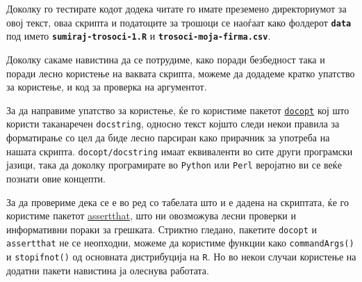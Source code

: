 \documentclass[
]{book}
\begin{document}
Доколку го тестирате кодот додека читате го имате преземено директориумот за овој текст, оваа скрипта и податоците за трошоци се наоѓаат како фолдерот \textbf{\texttt{data}} под името \textbf{\texttt{sumiraj-trosoci-1.R}} и \textbf{\texttt{trosoci-moja-firma.csv}}.

Доколку сакаме навистина да се потрудиме, како поради безбедност така и поради лесно користење на ваквата скрипта, можеме да додадеме кратко упатство за користење, и код за проверка на аргументот.

За да направиме упатство за користење, ќе го користиме пакетот \href{https://github.com/docopt/docopt.R}{\texttt{docopt}} кој што користи таканаречен \texttt{docstring}, односно текст којшто следи некои правила за форматирање со цел да биде лесно парсиран како прирачник за употреба на нашата скрипта. \texttt{docopt/docstring} имаат еквиваленти во сите други програмски јазици, така да доколку програмирате во \texttt{Python} или \texttt{Perl} веројатно ви се веќе познати овие концепти.

За да провериме дека се е во ред со табелата што и е дадена на скриптата, ќе го користиме пакетот \href{https://github.com/hadley/assertthat}{assertthat}, што ни овозможува лесни проверки и информативни пораки за грешката. Стриктно гледано, пакетите \texttt{docopt} и \texttt{assertthat} не се неопходни, можеме да користиме функции како \texttt{commandArgs()} и \texttt{stopifnot()} од основната дистрибуција на \texttt{R}. Но во некои случаи користење на додатни пакети навистина ја олеснува работата.
\end{document}
